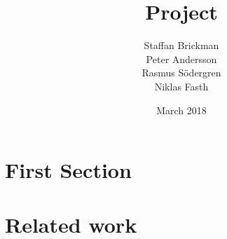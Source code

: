 \documentclass{article}
\title{Project}
\author{Staffan Brickman\\
Peter Andersson\\
Rasmus Södergren\\
Niklas Fasth}
\date{March 2018}
\begin{document}
\maketitle
\section{First Section}

\section{Related work}


\printbibliography
\end{document}
